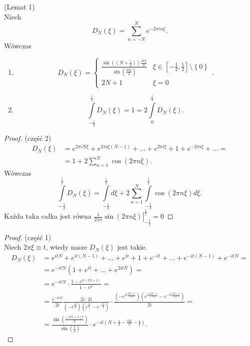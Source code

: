 \documentclass[../main.tex]{subfiles}
\begin{document}
\begin{tw}
    (Lemat 1)\\
    Niech
    \[
        D_N (\xi) = \sum_{n=-N}^{N} e^{-2\pi i n \xi}
    .\]
Wówczas
    \begin{enumerate}
    \item \[
            D_N(\xi) = \begin{cases}
                \frac{\sin\left( (N+\frac{1}{2}) \right) \frac{2\pi \xi}{2}}{\sin\left( \frac{2\pi \xi}{2} \right) } & \xi\in \left[ -\frac{1}{2},\frac{1}{2} \right]  \setminus \left\{ 0 \right\}\\
                2N + 1 & \xi = 0
            \end{cases}
    .\]
\item
    \[
        \int\limits_{-\frac{1}{2}}^{\frac{1}{2}} D_N(\xi) = 1 = 2 \int\limits_{0}^{\frac{1}{2}} D_N(\xi)
    .\]
\end{enumerate}
\end{tw}
\begin{proof}
    (część 2)\\
    \begin{align*}
        D_N(\xi) &= e^{2\pi i N \xi} + e^{2\pi i \xi (N - 1)} + \ldots + e^{2\pi i \xi} + 1 + e^{-2\pi i \xi} + \ldots =\\
        &= 1 + 2 \sum_{n=1}^{N} \cos(2\pi n \xi)
    .\end{align*}
    Wówczas
    \[
        \int\limits_{-\frac{1}{2}}^{\frac{1}{2}} D_N(\xi) = \int\limits_{-\frac{1}{2}}^{\frac{1}{2}} d\xi + 2 \sum_{n=1}^{N} \int\limits_{-\frac{1}{2}}^{\frac{1}{2}} \cos(2\pi n \xi)d\xi
    .\]
Każda taka całka jest równa $\left.\frac{1}{2\pi n}\sin(2\pi n \xi)\right|_{-\frac{1}{2}}^{\frac{1}{2}} = 0$
\end{proof}
\begin{proof}
    (część 1)\\
    Niech $2\pi \xi \equiv t$, wtedy nasze $D_N(\xi)$ jest takie.
    \begin{align*}
        D_N(\xi) &= e^{i t N} + e^{i t (N-1)} + \ldots + e^{it} + 1 + e^{-it} + \ldots + e^{-it(N-1)} + e^{-itN} = \\
        &= e^{-itN}(1 + e^{it} + \ldots + e^{2i tN}) = \\
        &= e^{-itN} \cdot \frac{1-e^{it(2N+1)}}{1-e^{it}} = \\
        &= \frac{e^{-itN}}{2i}\frac{2i \cdot 2i}{\left(-e^{\frac{it}{2}}\right)\left(e^{\frac{it}{2}} - e^{-\frac{it}{2}}\right)} \cdot \frac{\left(-e^{it\frac{2N+1}{2}}\right)\left(e^{it\frac{2N+1}{2}} - e^{-it\frac{2N+1}{2}}\right)}{2i} = \\
        &= \frac{\sin\left(\frac{(2N+1)t}{2}\right)}{\sin\left(\frac{t}{2}\right)} \cdot e^{-it(N + \frac{1}{2} - \frac{2N}{2} - \frac{1}{2})}
    .\end{align*}
\end{proof}
\end{document}
